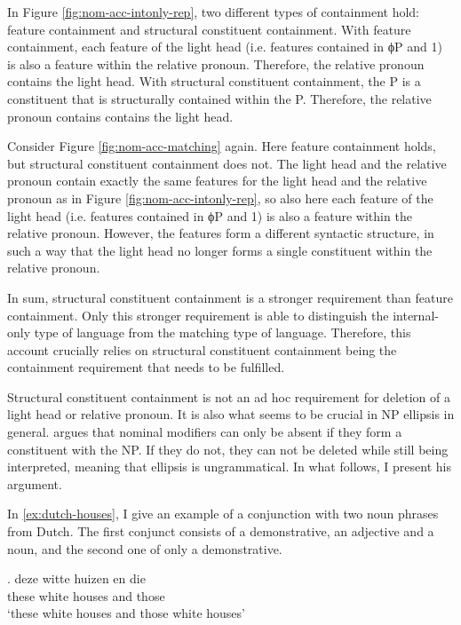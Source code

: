 In Figure \ref{fig:nom-acc-intonly-rep}, two different types of containment hold: feature containment and structural constituent containment.
With feature containment, each feature of the light head (i.e. features contained in ϕP and 1) is also a feature within the relative pronoun. Therefore, the relative pronoun contains the light head.
With structural constituent containment, the P is a constituent that is structurally contained within the P. Therefore, the relative pronoun contains contains the light head.

Consider Figure \ref{fig:nom-acc-matching} again. Here feature containment holds, but structural constituent containment does not.
The light head and the relative pronoun contain exactly the same features for the light head and the relative pronoun as in Figure \ref{fig:nom-acc-intonly-rep}, so also here each feature of the light head (i.e. features contained in ϕP and 1) is also a feature within the relative pronoun.
However, the features form a different syntactic structure, in such a way that the light head no longer forms a single constituent within the relative pronoun.

In sum, structural constituent containment is a stronger requirement than feature containment. Only this stronger requirement is able to distinguish the internal-only type of language from the matching type of language. Therefore, this account crucially relies on structural constituent containment being the containment requirement that needs to be fulfilled.

Structural constituent containment is not an ad hoc requirement for deletion of a light head or relative pronoun. It is also what seems to be crucial in NP ellipsis in general. \citet{cinqueforthcoming} argues that nominal modifiers can only be absent if they form a constituent with the NP. If they do not, they can not be deleted while still being interpreted, meaning that ellipsis is ungrammatical. In what follows, I present his argument.

In \ref{ex:dutch-houses}, I give an example of a conjunction with two noun phrases from Dutch. The first conjunct consists of a demonstrative, an adjective and a noun, and the second one of only a demonstrative.

\exg. deze witte huizen en die\\
 these white houses and those\\
 `these white houses and those white houses' \label{ex:dutch-houses}

